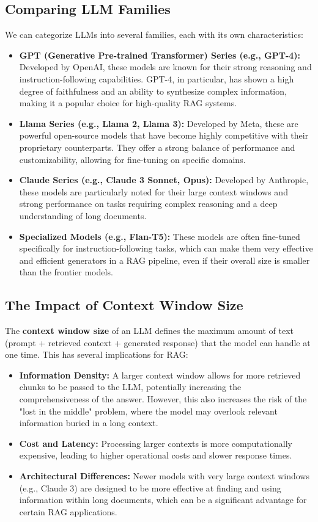 \subsection{Comparing LLM Families}
We can categorize LLMs into several families, each with its own characteristics:
\begin{itemize}
    \item \textbf{GPT (Generative Pre-trained Transformer) Series (e.g., GPT-4):} Developed by OpenAI, these models are known for their strong reasoning and instruction-following capabilities. GPT-4, in particular, has shown a high degree of faithfulness and an ability to synthesize complex information, making it a popular choice for high-quality RAG systems.
    \item \textbf{Llama Series (e.g., Llama 2, Llama 3):} Developed by Meta, these are powerful open-source models that have become highly competitive with their proprietary counterparts. They offer a strong balance of performance and customizability, allowing for fine-tuning on specific domains.
    \item \textbf{Claude Series (e.g., Claude 3 Sonnet, Opus):} Developed by Anthropic, these models are particularly noted for their large context windows and strong performance on tasks requiring complex reasoning and a deep understanding of long documents.
    \item \textbf{Specialized Models (e.g., Flan-T5):} These models are often fine-tuned specifically for instruction-following tasks, which can make them very effective and efficient generators in a RAG pipeline, even if their overall size is smaller than the frontier models.
\end{itemize}

\subsection{The Impact of Context Window Size}
The \textbf{context window size} of an LLM defines the maximum amount of text (prompt + retrieved context + generated response) that the model can handle at one time. This has several implications for RAG:
\begin{itemize}
    \item \textbf{Information Density:} A larger context window allows for more retrieved chunks to be passed to the LLM, potentially increasing the comprehensiveness of the answer. However, this also increases the risk of the "lost in the middle" problem, where the model may overlook relevant information buried in a long context.
    \item \textbf{Cost and Latency:} Processing larger contexts is more computationally expensive, leading to higher operational costs and slower response times.
    \item \textbf{Architectural Differences:} Newer models with very large context windows (e.g., Claude 3) are designed to be more effective at finding and using information within long documents, which can be a significant advantage for certain RAG applications.
\end{itemize}

